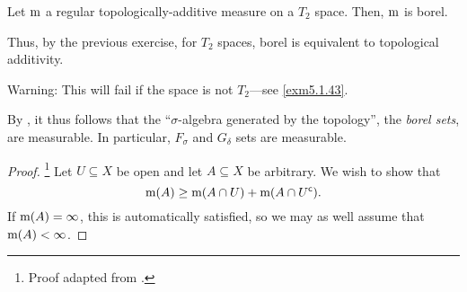 \begin{prp}\label{prp5.1.57}
Let $\mathrm{m}$ a regular topologically-additive measure on a $T_2$ space.  Then, $\mathrm{m}$ is borel.
\begin{rmk}
Thus, by the previous exercise, for $T_2$ spaces, borel is equivalent to topological additivity.
\end{rmk}
\begin{rmk}
Warning:  This will fail if the space is not $T_2$---see \cref{exm5.1.43}.
\end{rmk}
\begin{rmk}
By , it thus follows that the ``$\sigma$-algebra generated by the topology'', the \emph{borel sets}, are measurable.  In particular, $F_\sigma$ and $G_\delta$ sets are measurable.
\end{rmk}
\begin{proof}\footnote{Proof adapted from \cite[pg.~194]{Cohn}.}
Let $U\subseteq X$ be open and let $A\subseteq X$ be arbitrary.  We wish to show that
\begin{equation}
\mathrm{m} (A)\geq \mathrm{m} (A\cap U)+\mathrm{m} (A\cap U^{\mathsf{c}}).
\end{equation}
If $\mathrm{m} (A)=\infty$, this is automatically satisfied, so we may as well assume that $\mathrm{m} (A)<\infty$.


\end{proof}
\end{prp}
